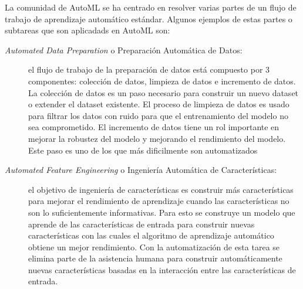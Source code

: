 La comunidad de AutoML se ha centrado en resolver varias partes de un flujo de trabajo de aprendizaje automático estándar. Algunos ejemplos de estas partes o subtareas que son aplicadads en AutoML son:

\begin{description}
	\item[\textit{Automated Data Preparation} o Preparación Automática de Datos:] el flujo de trabajo de la preparación de datos está compuesto por 3 componentes: colección de datos, limpieza de datos e incremento de datos. La colección de datos es un paso necesario para construir un nuevo dataset o extender el dataset existente. El proceso de limpieza de datos es usado para filtrar los datos con ruido para que el entrenamiento del modelo no sea comprometido. El incremento de datos tiene un rol importante en mejorar la robustez del modelo y mejorando el rendimiento del modelo. Este paso es uno de los que más dificilmente son automatizados
	
	\item[\textit{Automated Feature Engineering} o Ingeniería Automática de Características:] el objetivo de ingeniería de características es construir más características para mejorar el rendimiento de aprendizaje cuando las características no son lo suficientemente informativas. Para esto se construye un modelo que aprende de las características de entrada para construir nuevas características con las cuales el algoritmo de aprendizaje automático obtiene un mejor rendimiento. Con la automatización de esta tarea se elimina parte de la asistencia humana para construir automáticamente nuevas características basadas en la interacción entre las características de entrada.
	

	

\end{description}
